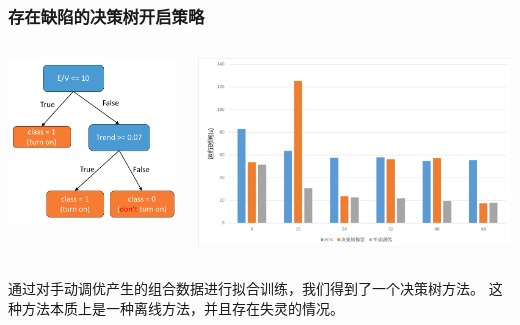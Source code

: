 \documentclass[10pt]{beamer}
\begin{document}
\begin{frame}%
  \frametitle{存在缺陷的决策树开启策略}
  \begin{columns}
    \begin{column}{0.4\textwidth}
      \centering
      \includegraphics[width=1.0\textwidth]{Img/decision_tree}
    \end{column}
    \begin{column}{0.6\textwidth}  %
      \centering
      \includegraphics[width=1.0\textwidth]{Img/dtreefail}
    \end{column}
  \end{columns}

  \vspace{2em}

  通过对手动调优产生的组合数据进行拟合训练，我们得到了一个决策树方法。
  这种方法本质上是一种离线方法，并且存在失灵的情况。
\end{frame}
\end{document}
